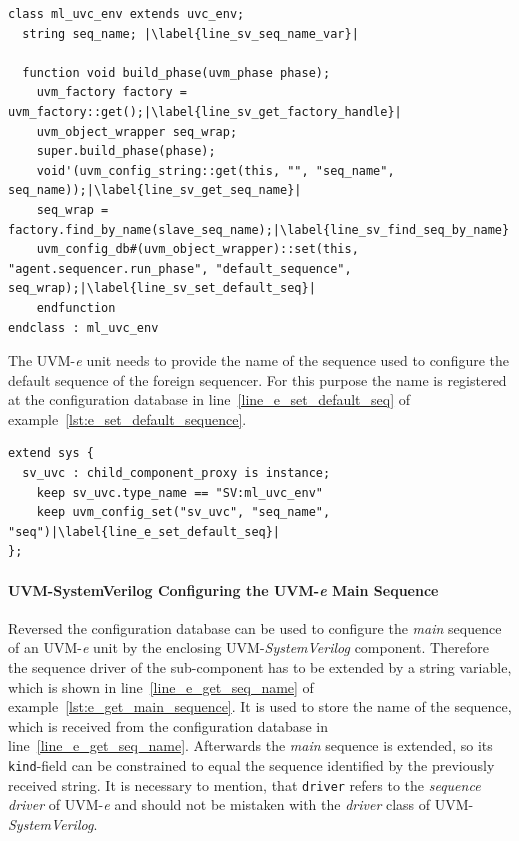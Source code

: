 \lstset{language=SystemVerilog, numbers = left, escapechar=|, breaklines=true}
\begin{lstlisting}[frame=htrbl, caption={SystemVerilog: getting the default sequence from configuration database},
label={lst:SV_get_default_sequence}]
class ml_uvc_env extends uvc_env;
  string seq_name; |\label{line_sv_seq_name_var}|
  
  function void build_phase(uvm_phase phase);
    uvm_factory factory = uvm_factory::get();|\label{line_sv_get_factory_handle}|
    uvm_object_wrapper seq_wrap;
    super.build_phase(phase);
    void'(uvm_config_string::get(this, "", "seq_name", seq_name));|\label{line_sv_get_seq_name}|
    seq_wrap = factory.find_by_name(slave_seq_name);|\label{line_sv_find_seq_by_name}|
    uvm_config_db#(uvm_object_wrapper)::set(this, "agent.sequencer.run_phase", "default_sequence", seq_wrap);|\label{line_sv_set_default_seq}|
    endfunction
endclass : ml_uvc_env
\end{lstlisting}
The UVM-\textit{e} unit needs to provide the name of the sequence used to configure the default sequence of the foreign sequencer. For this purpose the name is registered at the configuration database in line~\ref{line_e_set_default_seq} of example~\ref{lst:e_set_default_sequence}.
\lstset{language=e, numbers = left, escapechar=|, breaklines=true}
\begin{lstlisting}[frame=htrbl, caption={\textit{e}: setting the default sequence via configuration database},
label={lst:e_set_default_sequence}]
extend sys {
  sv_uvc : child_component_proxy is instance;
    keep sv_uvc.type_name == "SV:ml_uvc_env"
    keep uvm_config_set("sv_uvc", "seq_name", "seq")|\label{line_e_set_default_seq}|
};
\end{lstlisting}
\paragraph{UVM-SystemVerilog Configuring the UVM-\textit{e} Main Sequence}
Reversed the configuration database can be used to configure the \emph{main} sequence of an UVM-\textit{e} unit by the enclosing UVM-\emph{SystemVerilog} component. Therefore the sequence driver of the sub-component has to be extended by a string variable, which is shown in line~\ref{line_e_get_seq_name} of example~\ref{lst:e_get_main_sequence}. It is used to store the name of the sequence, which is received from the configuration database in line~\ref{line_e_get_seq_name}. Afterwards the \emph{main} sequence is extended, so its \lstinline$kind$-field can be constrained to equal the sequence identified by the previously received string. It is necessary to mention, that \lstinline$driver$ refers to the \emph{sequence driver} of UVM-\textit{e} and should not be mistaken with the \emph{driver} class of UVM-\emph{SystemVerilog}. 

